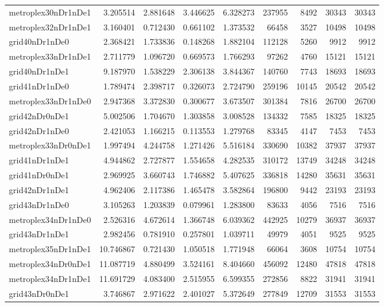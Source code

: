\begin{longtable}{|l|r|r|r|r|r|r|r|r|}
metroplex30nDr1nDe1 & 3.205514 & 2.881648 & 3.446625 & 6.328273 & 237955 & 8492 & 30343 & 30343 \\
metroplex32nDr1nDe1 & 3.160401 & 0.712430 & 0.661102 & 1.373532 & 66458 & 3527 & 10498 & 10498 \\
grid40nDr1nDe0 & 2.368421 & 1.733836 & 0.148268 & 1.882104 & 112128 & 5260 & 9912 & 9912 \\
metroplex33nDr1nDe1 & 2.711779 & 1.096720 & 0.669573 & 1.766293 & 97262 & 4760 & 15121 & 15121 \\
grid40nDr1nDe1 & 9.187970 & 1.538229 & 2.306138 & 3.844367 & 140760 & 7743 & 18693 & 18693 \\
grid41nDr1nDe0 & 1.789474 & 2.398717 & 0.326073 & 2.724790 & 259196 & 10145 & 20542 & 20542 \\
metroplex33nDr1nDe0 & 2.947368 & 3.372830 & 0.300677 & 3.673507 & 301384 & 7816 & 26700 & 26700 \\
grid42nDr0nDe1 & 5.002506 & 1.704670 & 1.303858 & 3.008528 & 134332 & 7585 & 18325 & 18325 \\
grid42nDr1nDe0 & 2.421053 & 1.166215 & 0.113553 & 1.279768 & 83345 & 4147 & 7453 & 7453 \\
metroplex33nDr0nDe1 & 1.997494 & 4.244758 & 1.271426 & 5.516184 & 330690 & 10382 & 37937 & 37937 \\
grid41nDr1nDe1 & 4.944862 & 2.727877 & 1.554658 & 4.282535 & 310172 & 13749 & 34248 & 34248 \\
grid41nDr0nDe1 & 2.969925 & 3.660743 & 1.746882 & 5.407625 & 336818 & 14280 & 35631 & 35631 \\
grid42nDr1nDe1 & 4.962406 & 2.117386 & 1.465478 & 3.582864 & 196800 & 9442 & 23193 & 23193 \\
grid43nDr1nDe0 & 3.105263 & 1.203839 & 0.079961 & 1.283800 & 83633 & 4056 & 7516 & 7516 \\
metroplex34nDr1nDe0 & 2.526316 & 4.672614 & 1.366748 & 6.039362 & 442925 & 10279 & 36937 & 36937 \\
grid43nDr1nDe1 & 2.982456 & 0.781910 & 0.257801 & 1.039711 & 49979 & 4051 & 9525 & 9525 \\
metroplex35nDr1nDe1 & 10.746867 & 0.721430 & 1.050518 & 1.771948 & 66064 & 3608 & 10754 & 10754 \\
metroplex34nDr0nDe1 & 11.087719 & 4.880499 & 3.524161 & 8.404660 & 456092 & 12480 & 47818 & 47818 \\
metroplex34nDr1nDe1 & 11.691729 & 4.083400 & 2.515955 & 6.599355 & 272856 & 8822 & 31941 & 31941 \\
grid43nDr0nDe1 & 3.746867 & 2.971622 & 2.401027 & 5.372649 & 277849 & 12709 & 31553 & 31553 \\

\end{longtable}
